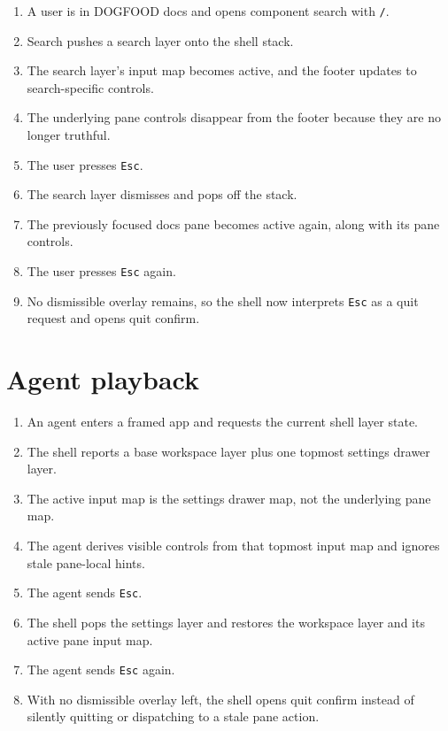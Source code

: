 \begin{enumerate}
\def\labelenumi{\arabic{enumi}.}
\tightlist
\item
  A user is in DOGFOOD docs and opens component search with \texttt{/}.
\item
  Search pushes a search layer onto the shell stack.
\item
  The search layer's input map becomes active, and the footer updates to search-specific controls.
\item
  The underlying pane controls disappear from the footer because they are no longer truthful.
\item
  The user presses \texttt{E\allowbreak{}s\allowbreak{}c}.
\item
  The search layer dismisses and pops off the stack.
\item
  The previously focused docs pane becomes active again, along with its pane controls.
\item
  The user presses \texttt{E\allowbreak{}s\allowbreak{}c} again.
\item
  No dismissible overlay remains, so the shell now interprets \texttt{E\allowbreak{}s\allowbreak{}c} as a quit request and opens quit confirm.
\end{enumerate}

\section{Agent playback}\label{record-254-agent-playback}

\begin{enumerate}
\def\labelenumi{\arabic{enumi}.}
\tightlist
\item
  An agent enters a framed app and requests the current shell layer state.
\item
  The shell reports a base workspace layer plus one topmost settings drawer layer.
\item
  The active input map is the settings drawer map, not the underlying pane map.
\item
  The agent derives visible controls from that topmost input map and ignores stale pane-local hints.
\item
  The agent sends \texttt{E\allowbreak{}s\allowbreak{}c}.
\item
  The shell pops the settings layer and restores the workspace layer and its active pane input map.
\item
  The agent sends \texttt{E\allowbreak{}s\allowbreak{}c} again.
\item
  With no dismissible overlay left, the shell opens quit confirm instead of silently quitting or dispatching to a stale pane action.
\end{enumerate}

